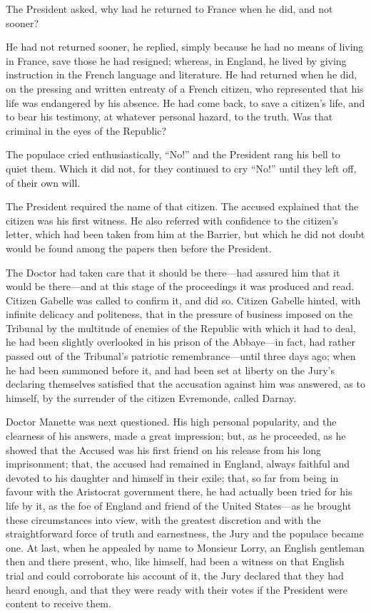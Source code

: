 The President asked, why had he returned to France when he did,
and not sooner?

He had not returned sooner, he replied, simply because he had no
means of living in France, save those he had resigned; whereas, in
England, he lived by giving instruction in the French language and
literature. He had returned when he did, on the pressing and written
entreaty of a French citizen, who represented that his life was
endangered by his absence.  He had come back, to save a citizen's life,
and to bear his testimony, at whatever personal hazard, to the truth.
Was that criminal in the eyes of the Republic?

The populace cried enthusiastically, ``No!'' and the President rang his
bell to quiet them.  Which it did not, for they continued to cry
``No!'' until they left off, of their own will.

The President required the name of that citizen.  The accused
explained that the citizen was his first witness.  He also referred
with confidence to the citizen's letter, which had been taken from
him at the Barrier, but which he did not doubt would be found among
the papers then before the President.

The Doctor had taken care that it should be there---had assured him
that it would be there---and at this stage of the proceedings it was
produced and read.  Citizen Gabelle was called to confirm it, and did
so. Citizen Gabelle hinted, with infinite delicacy and politeness,
that in the pressure of business imposed on the Tribunal by the
multitude of enemies of the Republic with which it had to deal, he
had been slightly overlooked in his prison of the Abbaye---in fact,
had rather passed out of the Tribunal's patriotic remembrance---until
three days ago; when he had been summoned before it, and had been set
at liberty on the Jury's declaring themselves satisfied that the
accusation against him was answered, as to himself, by the surrender
of the citizen Evremonde, called Darnay.

Doctor Manette was next questioned.  His high personal popularity,
and the clearness of his answers, made a great impression; but, as he
proceeded, as he showed that the Accused was his first friend on his
release from his long imprisonment; that, the accused had remained in
England, always faithful and devoted to his daughter and himself in
their exile; that, so far from being in favour with the Aristocrat
government there, he had actually been tried for his life by it, as
the foe of England and friend of the United States---as he brought
these circumstances into view, with the greatest discretion and with
the straightforward force of truth and earnestness, the Jury and the
populace became one.  At last, when he appealed by name to Monsieur
Lorry, an English gentleman then and there present, who, like himself,
had been a witness on that English trial and could corroborate his
account of it, the Jury declared that they had heard enough, and that
they were ready with their votes if the President were content to
receive them.

